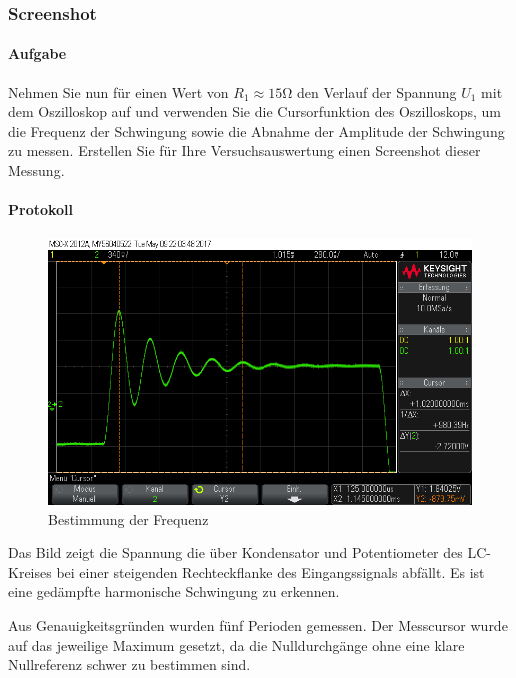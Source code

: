 \documentclass[10pt]{scrreprt}
\begin{document}
        \subsubsection{Screenshot}
        \paragraph{Aufgabe}
        Nehmen Sie nun für einen Wert von $R_1 \approx 15\si{\ohm}$ den Verlauf der Spannung $U_1$
        mit dem Oszilloskop auf und verwenden Sie die Cursorfunktion des Oszilloskops,
        um die Frequenz der Schwingung sowie die Abnahme der Amplitude
        der Schwingung zu messen. Erstellen Sie für Ihre Versuchsauswertung einen
        Screenshot dieser Messung.

        \paragraph{Protokoll}
        \begin{center}
            \begin{figure}[H]
                \includegraphics[width=\textwidth]{scope_19.png}
                \caption{Bestimmung der Frequenz}
            \end{figure}
        \end{center}

        Das Bild zeigt die Spannung die über Kondensator und
        Potentiometer des LC-Kreises bei einer
        steigenden Rechteckflanke des Eingangssignals abfällt.
        Es ist eine gedämpfte harmonische Schwingung zu erkennen.

        Aus Genauigkeitsgründen wurden fünf Perioden gemessen. Der Messcursor
        wurde auf das jeweilige Maximum gesetzt, da die Nulldurchgänge ohne eine
        klare Nullreferenz schwer zu bestimmen sind.
\end{document}
